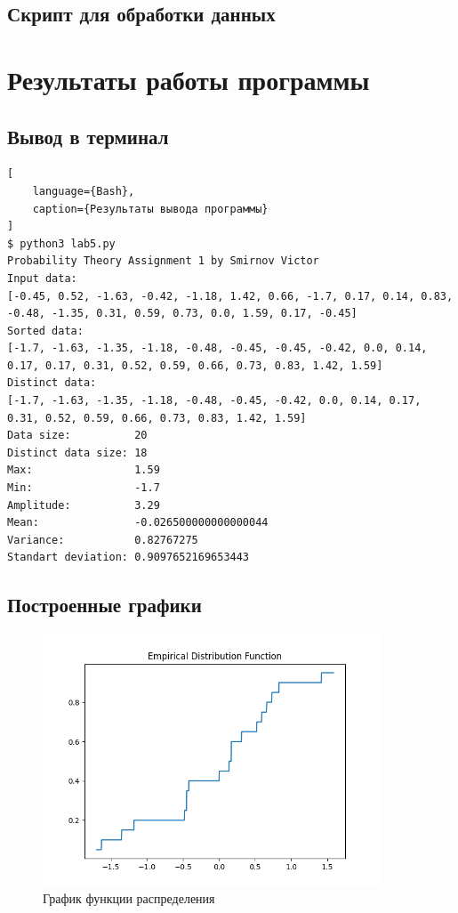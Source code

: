\documentclass{article}
\begin{document}
\subsection{Скрипт для обработки данных}



\section{Результаты работы программы}

\subsection{Вывод в терминал}

\begin{lstlisting}[
    language={Bash},
    caption={Результаты вывода программы}
]
$ python3 lab5.py
Probability Theory Assignment 1 by Smirnov Victor
Input data:
[-0.45, 0.52, -1.63, -0.42, -1.18, 1.42, 0.66, -1.7, 0.17, 0.14, 0.83, -0.48, -1.35, 0.31, 0.59, 0.73, 0.0, 1.59, 0.17, -0.45]
Sorted data:
[-1.7, -1.63, -1.35, -1.18, -0.48, -0.45, -0.45, -0.42, 0.0, 0.14, 0.17, 0.17, 0.31, 0.52, 0.59, 0.66, 0.73, 0.83, 1.42, 1.59]
Distinct data:
[-1.7, -1.63, -1.35, -1.18, -0.48, -0.45, -0.42, 0.0, 0.14, 0.17, 0.31, 0.52, 0.59, 0.66, 0.73, 0.83, 1.42, 1.59]
Data size:          20
Distinct data size: 18
Max:                1.59
Min:                -1.7
Amplitude:          3.29
Mean:               -0.026500000000000044
Variance:           0.82767275
Standart deviation: 0.9097652169653443
\end{lstlisting}

\subsection{Построенные графики}


\begin{figure}[h]
    \centering
    \includegraphics[width=10cm]{dist.png}
    \caption{График функции распределения}
\end{figure}
\end{document}
